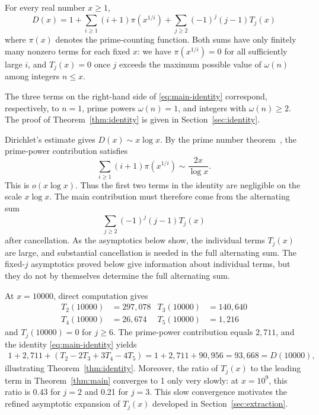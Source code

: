 \begin{theorem}\label{thm:identity}
    For every real number $x\geq1$,
    \begin{equation}\label{eq:main-identity}
        D(x)=1+\sum_{i\geq 1}(i+1)\pi(x^{1/i})+\sum_{j\geq 2}(-1)^j(j-1)T_j(x)
\end{equation}
where $\pi(x)$ denotes the prime-counting function. Both sums have
only finitely many nonzero terms for each fixed $x$: we have
$\pi(x^{1/i})=0$ for all sufficiently large $i$, and $T_j(x)=0$
once $j$ exceeds the maximum possible value of $\omega(n)$ among
integers $n\leq x$.
\end{theorem}

The three terms on the right-hand side of \eqref{eq:main-identity} correspond, respectively, to $n = 1$, prime powers $\omega(n) = 1$, and integers with $\omega(n)\geq 2$. The proof of Theorem~\ref{thm:identity} is given in Section~\ref{sec:identity}.

Dirichlet's estimate gives $D(x)\sim x\log x$. By the prime number
theorem~\cite{Apostol1976}, the prime-power contribution satisfies
\begin{equation}
     \sum_{i \geq 1} (i+1) \pi(x^{1/i}) \sim \frac{2x}{\log x}.
\end{equation}
This is $o(x\log x)$. Thus the first two terms in the identity are
negligible on the scale $x\log x$. The main contribution must
therefore come from the alternating sum
\begin{equation}
    \sum_{j \geq 2} (-1)^j (j-1) T_j(x)
\end{equation}
after cancellation. As the asymptotics below show, the individual
terms $T_j(x)$ are large, and substantial cancellation is needed in
the full alternating sum. The fixed-$j$ asymptotics proved below give
information about individual terms, but they do not by themselves
determine the full alternating sum.

\begin{example}
    At $x=10000$, direct computation gives
    \begin{align*}
        T_2(10000) &= 297{,}078 & T_3(10000) &= 140{,}640 \\
        T_4(10000) &= 26{,}674  & T_5(10000) &= 1{,}216
    \end{align*}
    and $T_j(10000)=0$ for $j\geq6$. The prime-power contribution equals
$2{,}711$, and the identity \eqref{eq:main-identity} yields
    \begin{align*}
        1+2{,}711+(T_2-2T_3+3T_4-4T_5)=1+2{,}711+90{,}956=93{,}668=D(10000),
    \end{align*}
    illustrating Theorem~\ref{thm:identity}. Moreover, the ratio of
$T_j(x)$ to the leading term in Theorem~\ref{thm:main} converges to
1 only very slowly: at $x=10^9$, this ratio is 0.43 for $j=2$ and
0.21 for $j=3$. This slow convergence motivates the refined
asymptotic expansion of $T_j(x)$ developed in
Section~\ref{sec:extraction}.
\end{example}

